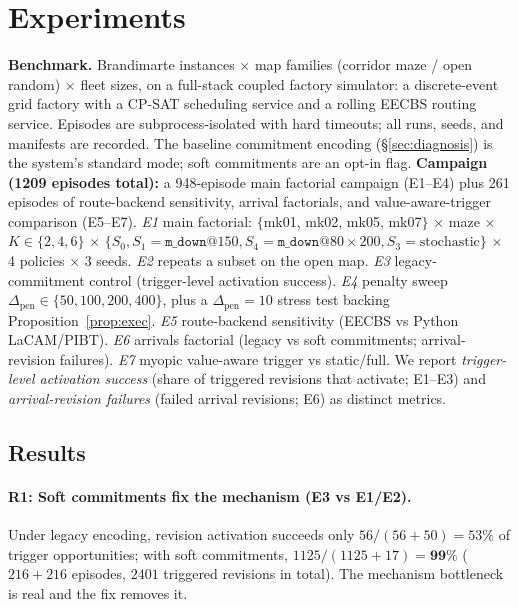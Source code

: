 \documentclass[twocolumn]{article}
\begin{document}
\section{Experiments}
\label{sec:experiments}
\textbf{Benchmark.} Brandimarte instances $\times$ map families
(corridor maze / open random) $\times$ fleet sizes, on a full-stack
coupled factory simulator: a discrete-event grid factory with a CP-SAT
scheduling service and a rolling EECBS routing service. Episodes are
subprocess-isolated with hard timeouts; all runs, seeds, and manifests
are recorded. The baseline commitment encoding (\S\ref{sec:diagnosis})
is the system's standard mode; soft commitments are an opt-in flag.
\textbf{Campaign (1209 episodes total):} a 948-episode main factorial
campaign (E1--E4) plus 261 episodes of route-backend sensitivity,
arrival factorials, and value-aware-trigger comparison (E5--E7).
\emph{E1} main factorial: $\{$mk01, mk02, mk05, mk07$\}$ $\times$ maze
$\times$ $K\in\{2,4,6\}$ $\times$ $\{S_0, S_1{=}\texttt{m\_down}@150,
S_4{=}\texttt{m\_down}@80{\times}200, S_3{=}\text{stochastic}\}$ $\times$
4 policies $\times$ 3 seeds.
\emph{E2} repeats a subset on the open map.
\emph{E3} legacy-commitment control (trigger-level activation success).
\emph{E4} penalty sweep $\Delta_{\mathrm{pen}}\in\{50,100,200,400\}$,
plus a $\Delta_{\mathrm{pen}}{=}10$ stress test backing
Proposition~\ref{prop:exec}.
\emph{E5} route-backend sensitivity (EECBS vs Python LaCAM/PIBT).
\emph{E6} arrivals factorial (legacy vs soft commitments;
arrival-revision failures).
\emph{E7} myopic value-aware trigger vs static/full.
We report \emph{trigger-level activation success} (share of triggered
revisions that activate; E1--E3) and \emph{arrival-revision failures}
(failed arrival revisions; E6) as distinct metrics.

\subsection{Results}

\paragraph{R1: Soft commitments fix the mechanism (E3 vs E1/E2).}
Under legacy encoding, revision activation succeeds only
$56/(56{+}50)=53\%$ of trigger opportunities; with soft commitments,
$1125/(1125{+}17)=\mathbf{99\%}$ ($216{+}216$ episodes, $2401$
triggered revisions in total). The mechanism bottleneck is real and the
fix removes it.
\end{document}
